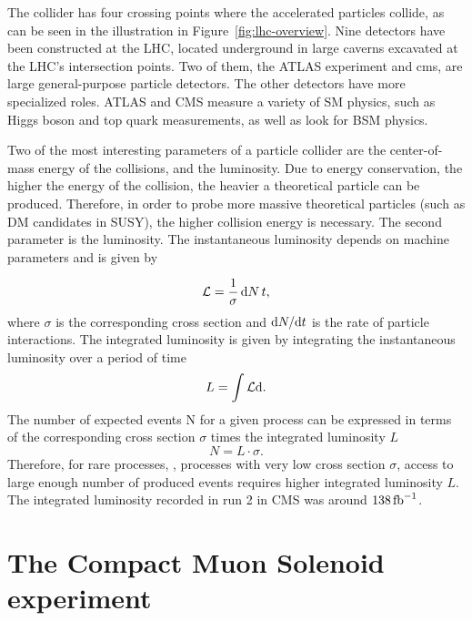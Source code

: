 The collider has four crossing points where the accelerated particles collide, as can be seen in the illustration in Figure~\ref{fig:lhc-overview}. Nine detectors have been constructed at the LHC, located underground in large caverns excavated at the LHC's intersection points. Two of them, the ATLAS experiment and \gls{cms}, are large general-purpose particle detectors. The other detectors have more specialized roles. ATLAS and CMS measure a variety of SM physics, such as Higgs boson and top quark measurements, as well as look for BSM physics.

Two of the most interesting parameters of a particle collider are the center-of-mass energy of the collisions, and the luminosity. Due to energy conservation, the higher the energy of the collision, the heavier a theoretical particle can be produced. Therefore, in order to probe more massive theoretical particles (such as DM candidates in SUSY), the higher collision energy is necessary. The second parameter is the luminosity. The instantaneous luminosity depends on machine parameters and is given by

\begin{equation}
\mathcal{L}=\frac{1}{\sigma} \dd{N}{t},
\end{equation}
where $\sigma$ is the corresponding cross section and $\mathrm{d} N/\mathrm{d} t$ is the rate of particle interactions. The integrated luminosity is given by integrating the instantaneous luminosity over a period of time
\begin{equation}
L=\int \mathcal{L} \mathrm{d} .
\end{equation}
The number of expected events N for a given process can be expressed in terms of the corresponding cross section $\sigma$ times the integrated luminosity $L$
\begin{equation}
N=L \cdot \sigma.
\end{equation}
Therefore, for rare processes, \ie, processes with very low cross section $\sigma$, access to large enough number of produced events requires higher integrated luminosity $L$. The integrated luminosity recorded in run 2 in CMS was around $138 \mbox{\ensuremath{\,\text{fb}^{-1}}}$.

\section{The Compact Muon Solenoid experiment}
\label{sec:cms}

